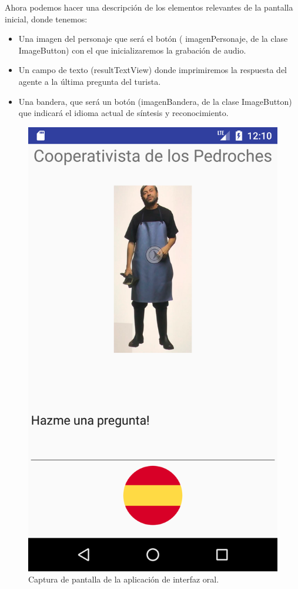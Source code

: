 Ahora podemos hacer una descripción de los elementos relevantes de la pantalla inicial, donde tenemos:

\begin{itemize}
	\item Una imagen del personaje que será el botón ( 
	imagenPersonaje, de la clase ImageButton) con el que inicializaremos la grabación de audio.
	\item Un campo de texto (resultTextView) donde imprimiremos la respuesta del agente a la última pregunta del turista.
	\item Una bandera, que será un botón (imagenBandera, de la clase ImageButton) que indicará el idioma actual de síntesis y reconocimiento.
\end{itemize}

\begin{figure}[H] %
	\centering
	\includegraphics[scale=0.2]{imagenes/app_oral.png}  %
	\caption{Captura de pantalla de la aplicación de interfaz oral.}
\end{figure}
